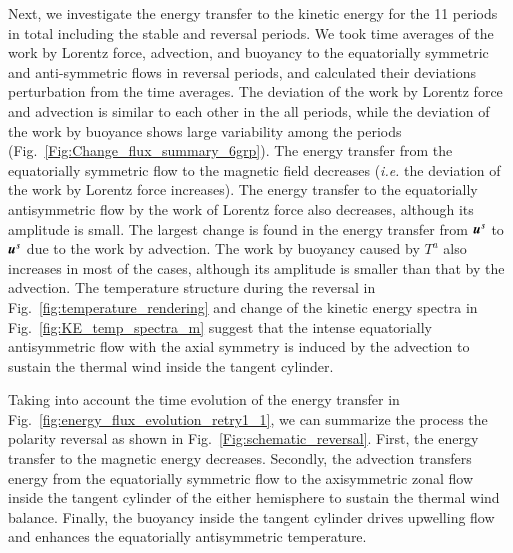 


Next, we investigate the energy transfer to the kinetic energy for the 11 periods in total including the stable and reversal periods. 
We took time averages of the work by Lorentz force, advection, and buoyancy to the equatorially symmetric and anti-symmetric flows in reversal periods, and calculated their deviations perturbation from the time averages.
{\color{red}
The deviation of the work by Lorentz force and advection is similar to each other in the all periods, while the deviation of the work by buoyance shows large variability among the periods (Fig.~\ref{Fig:Change_flux_summary_6grp}).
}
The energy transfer from the equatorially symmetric flow to the magnetic field decreases ({\it i.e.} the deviation of the work by Lorentz force increases). 
{\color{red}
The energy transfer to the equatorially antisymmetric flow by the work of Lorentz force also decreases, although its amplitude is small.
}
The largest change is found in the energy transfer from $\mbox{\boldmath$u$}^s$ to $\mbox{\boldmath$u$}^s$ due to the work by advection. 
The work by buoyancy caused by $T^a$ also increases in most of the cases, although its amplitude is smaller than that by the advection. 
The temperature structure during the reversal in Fig.~\ref{fig:temperature_rendering} and change of the kinetic energy spectra in Fig.~\ref{fig:KE_temp_spectra_m} suggest that the intense equatorially antisymmetric flow with the axial symmetry is induced by the advection to sustain the thermal wind inside the tangent cylinder. 

Taking into account the time evolution of the energy transfer in Fig.~\ref{fig:energy_flux_evolution_retry1_1}, we can summarize the process the polarity reversal as shown in Fig.~\ref{Fig:schematic_reversal}. 
First, the energy transfer to the magnetic energy decreases. 
Secondly, the advection transfers energy from the equatorially symmetric flow to the axisymmetric zonal flow inside the tangent cylinder of the either hemisphere to sustain the thermal wind balance. 
Finally, the buoyancy inside the tangent cylinder drives upwelling flow and enhances the equatorially antisymmetric temperature.

